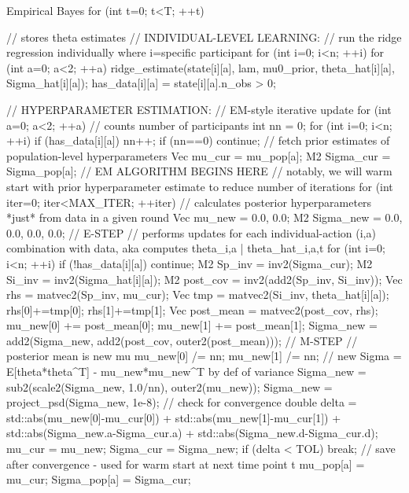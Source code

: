 \documentclass[letterpaper, 9pt]{extarticle}
\begin{document}
\begin{codechunk}{Empirical Bayes}
for (int t=0; t<T; ++t) {
    // stores theta estimates
    // INDIVIDUAL-LEVEL LEARNING:
    // run the ridge regression individually where i=specific participant
    for (int i=0; i<n; ++i) for (int a=0; a<2; ++a) {
        ridge_estimate(state[i][a], lam, mu0_prior,
                       theta_hat[i][a], Sigma_hat[i][a]);
        has_data[i][a] = state[i][a].n_obs > 0;
    }

    // HYPERPARAMETER ESTIMATION:
    // EM-style iterative update
    for (int a=0; a<2; ++a) {
        // counts number of participants 
        int nn = 0;
        for (int i=0; i<n; ++i) if (has_data[i][a]) nn++;
        if (nn==0) continue;
        // fetch prior estimates of population-level hyperparameters
        Vec mu_cur    = mu_pop[a];
        M2  Sigma_cur = Sigma_pop[a];
        // EM ALGORITHM BEGINS HERE
        // notably, we will warm start with prior hyperparameter estimate to reduce number of iterations 
        for (int iter=0; iter<MAX_ITER; ++iter) {
            // calculates posterior hyperparameters *just* from data in a given round
            Vec mu_new    = {0.0, 0.0};
            M2  Sigma_new = {0.0, 0.0, 0.0, 0.0};
            // E-STEP
            // performs updates for each individual-action (i,a) combination with data, aka computes theta_{i,a} | theta_hat_{i,a,t} 
            for (int i=0; i<n; ++i) {
                if (!has_data[i][a]) continue;
                M2  Sp_inv    = inv2(Sigma_cur);
                M2  Si_inv    = inv2(Sigma_hat[i][a]);
                M2  post_cov  = inv2(add2(Sp_inv, Si_inv));
                Vec rhs       = matvec2(Sp_inv, mu_cur);
                Vec tmp       = matvec2(Si_inv, theta_hat[i][a]);
                rhs[0]+=tmp[0]; rhs[1]+=tmp[1];
                Vec post_mean = matvec2(post_cov, rhs);
                mu_new[0] += post_mean[0];
                mu_new[1] += post_mean[1];
                Sigma_new = add2(Sigma_new, add2(post_cov, outer2(post_mean)));
            }
            // M-STEP
            // posterior mean is new mu
            mu_new[0] /= nn; mu_new[1] /= nn;
            // new Sigma = E[theta*theta^T] - mu_new*mu_new^T by def of variance
            Sigma_new = sub2(scale2(Sigma_new, 1.0/nn), outer2(mu_new));
            Sigma_new = project_psd(Sigma_new, 1e-8);
            // check for convergence 
            double delta = std::abs(mu_new[0]-mu_cur[0])
                         + std::abs(mu_new[1]-mu_cur[1])
                         + std::abs(Sigma_new.a-Sigma_cur.a)
                         + std::abs(Sigma_new.d-Sigma_cur.d);
            mu_cur = mu_new; Sigma_cur = Sigma_new;
            if (delta < TOL) break;
        }
        // save after convergence - used for warm start at next time point t
        mu_pop[a] = mu_cur; Sigma_pop[a] = Sigma_cur;
    }

}
\end{codechunk}
\end{document}
